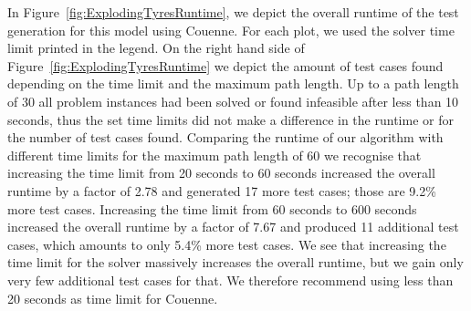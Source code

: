 \documentclass[runningheads,a4paper]{llncs}%
\newcommand{\OCLVar}[1]{\textit{#1}}
\begin{document}
In Figure~\ref{fig:ExplodingTyresRuntime}, we depict the overall runtime of the
test generation for this model using Couenne. For each plot, we used the solver
time limit printed in the legend. On the right hand side of
Figure~\ref{fig:ExplodingTyresRuntime} we depict the amount of test cases found
depending on the time limit and the maximum path length. Up to a path length of
30 all problem instances had been solved or found infeasible after less than 10
seconds, thus the set time limits did not make a difference in the runtime or
for the number of test cases found. Comparing the runtime of our algorithm with
different time limits for the maximum path length of 60 we recognise that
increasing the time limit from 20 seconds to 60 seconds increased the overall
runtime by a factor of 2.78 and generated 17 more test cases; those are 9.2\%
more test cases. Increasing the time limit from 60 seconds to 600 seconds
increased the overall runtime by a factor of 7.67 and produced 11 additional
test cases, which amounts to only 5.4\% more test cases. We see that increasing
the time limit for the solver massively increases the overall runtime, but we
gain only very few additional test cases for that. We therefore recommend using
less than 20 seconds as time limit for Couenne.
\end{document}
